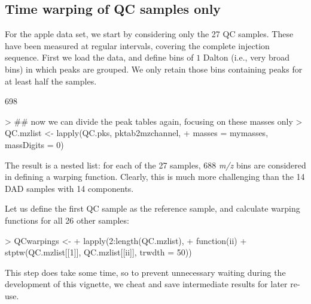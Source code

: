 \documentclass[a4paper,11pt]{article}
\begin{document}
\subsection{Time warping of QC samples only}
For the apple data set, we start by considering only the 27 QC
samples. These have been measured at regular intervals,
covering the complete injection sequence. First we load the data, and
define bins of $1$ Dalton (i.e., very broad bins) in which peaks are
grouped. We only retain those bins containing peaks for at least half
the samples.
\begin{Schunk}
\begin{Soutput}
[1] 698
\end{Soutput}
\end{Schunk}
\begin{Schunk}
\begin{Sinput}
> ## now we can divide the peak tables again, focusing on these masses only 
> QC.mzlist <- lapply(QC.pks, pktab2mzchannel, 
+                     masses = mymasses, massDigits = 0)
\end{Sinput}
\end{Schunk}
The result is a nested list: for each of the 27 samples, 688
\emph{m/z} bins are considered in defining a warping
function. Clearly, this is much more challenging than the 14 DAD
samples with 14 components.

Let us define the first QC sample as the reference sample, and
calculate warping functions for all 26 other samples:
\begin{Schunk}
\begin{Sinput}
> QCwarpings <- 
+   lapply(2:length(QC.mzlist),
+          function(ii)
+            stptw(QC.mzlist[[1]], QC.mzlist[[ii]], trwdth = 50))
\end{Sinput}
\end{Schunk}
This step does take some time, so to prevent unnecessary waiting
during the development of this vignette, we cheat and save
intermediate results for later re-use.
\end{document}
